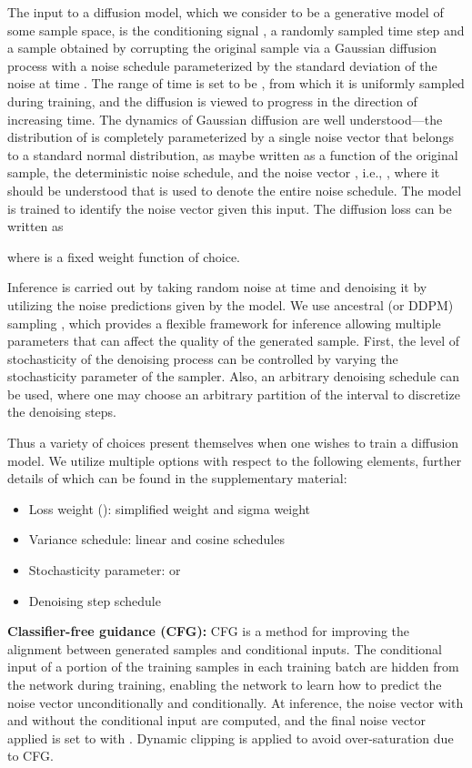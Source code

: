 \documentclass[nohyperref]{article}
\theoremstyle{plain}
\theoremstyle{definition}
\theoremstyle{remark}
\begin{document}
The input to a diffusion model, which we consider to be a generative model of some sample space, is the conditioning signal , a randomly sampled time step  and a sample  obtained by corrupting the original sample  via a Gaussian diffusion process with a noise schedule parameterized by the standard deviation  of the noise at time . The range of time  is set to be , from which it is uniformly sampled during training, and the diffusion is viewed to progress in the direction of increasing time. The dynamics of Gaussian diffusion are well understood---the distribution of  is completely parameterized by a single noise vector  that belongs to a standard normal distribution, as  maybe written as a function of the original sample, the deterministic noise schedule, and the noise vector , i.e., , where it should be understood that  is used to denote the entire noise schedule. The model  is trained to identify the noise vector given this input. The diffusion loss can be written as

where  is a fixed weight function of choice.

Inference is carried out by taking random noise at time  and denoising it by utilizing the noise predictions given by the model. We use ancestral (or DDPM) sampling \cite{ho2020denoising}, which provides a flexible framework for inference allowing multiple parameters that can affect the quality of the generated sample. First, the level of stochasticity of the denoising process can be controlled by varying the stochasticity parameter  of the sampler. Also, an arbitrary denoising schedule can be used, where one may choose an arbitrary partition of the interval  to discretize the denoising steps.

Thus a variety of choices present themselves when one wishes to train a diffusion model. We utilize multiple options with respect to the following elements, further details of which can be found in the supplementary material:
\begin{itemize}[itemsep=1pt]
\item Loss weight (): simplified weight  \cite{ho2020denoising} and sigma weight 
\item Variance schedule: linear \cite{ho2020denoising} and cosine \cite{nichol2021improved} schedules
\item Stochasticity parameter:  or 
\item Denoising step schedule
\end{itemize}

\textbf{Classifier-free guidance (CFG):} CFG \cite{ho2022classifier} is a method for improving the alignment between generated samples and conditional inputs. The conditional input of a portion of the training samples in each training batch are hidden from the network during training, enabling the network to learn how to predict the noise vector unconditionally and conditionally. At inference, the noise vector with and without the conditional input are computed, and the final noise vector applied is set to  with . Dynamic clipping \cite{saharia2022photorealistic} is applied to avoid over-saturation due to CFG.
\end{document}
